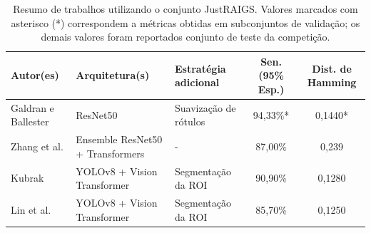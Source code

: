 \documentclass[12pt]{article}
\begin{document}
\begin{table}[htb]
    \centering
    \scriptsize
    \begin{tabular}{|p{2.5cm}|p{3cm}|l|c|c|}
    \hline
    \textbf{Autor(es)} & \textbf{Arquitetura(s)} & \textbf{Estratégia adicional} & \textbf{Sen. (95\% Esp.)} & \textbf{Dist. de Hamming} \\
    \hline
    Galdran e Ballester \cite{justraigs_galdran} & ResNet50 & Suavização de rótulos & 94,33\%* & 0,1440* \\
    \hline
    Zhang et al. \cite{justraigs_zhang} & Ensemble ResNet50 + Transformers & - & 87,00\% & 0,239 \\
    \hline
    Kubrak \cite{justraigs_kubrak} & YOLOv8 + Vision Transformer & Segmentação da ROI & 90,90\% & 0,1280 \\
    \hline
    Lin et al. \cite{justraigs_hu_lin} & YOLOv8 + Vision Transformer & Segmentação da ROI & 85,70\% & 0,1250 \\
    \hline
    \end{tabular}
    \caption{Resumo de trabalhos utilizando o conjunto JustRAIGS. Valores marcados com asterisco (*) correspondem a métricas obtidas em subconjuntos de validação; os demais valores foram reportados conjunto de teste da competição.}
    \label{tab:justraigs_work}
\end{table}
















\end{document}
